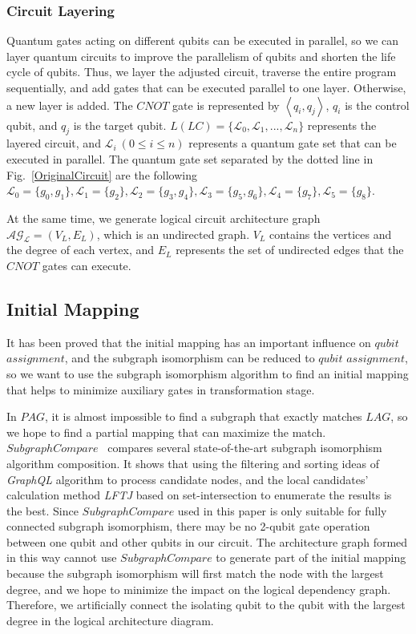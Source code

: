 \documentclass[runningheads]{llncs}
\begin{document}
\subsubsection{Circuit Layering}
Quantum gates acting on different qubits can be executed in parallel, so we can layer quantum circuits to improve the parallelism of qubits and shorten the life cycle of qubits. Thus, we layer the adjusted circuit, traverse the entire program sequentially, and add gates that can be executed parallel to one layer. Otherwise, a new layer is added. The $CNOT$ gate is represented by $\left \langle  \textit{q}_\textit{i}, \textit{q}_\textit{j} \right \rangle $, $\textit{q}_\textit{i}$ is the control qubit, and $\textit{q}_\textit{j}$ is the target qubit. $L(LC)=\{\mathcal{L}_{0},\mathcal{L}_{1},...,\mathcal{L}_{n}\}$ represents the layered circuit, and $\mathcal{L}_{i} \ (0 \le i \le n) $ represents a quantum gate set that can be executed in parallel. The quantum gate set separated by the dotted line in Fig.~\ref{OriginalCircuit} are the following $\mathcal{L}_{0}=\{g_{0},g_{1}\},\mathcal{L}_{1}=\{g_{2}\},
 \mathcal{L}_{2}=\{g_{3},g_{4}\},\mathcal{L}_{3}=\{g_{5},g_{6}\},\mathcal{L}_{4}=\{g_{7}\},\mathcal{L}_{5}=\{g_{8}\}$.

At the same time, we generate logical circuit architecture graph $\mathcal{AG_{L}}=(V_{L},E_{L})$, which is an undirected graph. $V_{L}$ contains the vertices and the degree of each vertex, and $E_{L}$ represents the set of undirected edges that the $CNOT$ gates can execute.

\subsection{Initial Mapping}
It has been proved that the initial mapping has an important influence on $qubit$  $ assignment$,  and the subgraph isomorphism can be reduced to $qubit$ $ assignment$, so we want to use the subgraph isomorphism algorithm to find an initial mapping that helps to minimize auxiliary gates in transformation stage.

In $PAG$, it is almost impossible to find a subgraph that exactly matches $LAG$, so we hope to find a partial mapping that can maximize the match. $SubgraphCompare$~\cite{Sun2020} compares several state-of-the-art subgraph isomorphism algorithm composition. 
It shows that using the filtering and sorting ideas of \emph{GraphQL} algorithm to process candidate nodes, and the local candidates' calculation method \emph{LFTJ} based on set-intersection to enumerate the results is the best. Since $SubgraphCompare$ used in this paper is only suitable for fully connected subgraph isomorphism, there may be no 2-qubit gate operation between one qubit and other qubits in our circuit. The architecture graph formed in this way cannot use $SubgraphCompare$ to generate part of the initial mapping because the subgraph isomorphism will first match the node with the largest degree,  and we hope to minimize the impact on the logical dependency graph. Therefore, we artificially connect the isolating qubit to the qubit with the largest degree in the logical architecture diagram.
\end{document}
